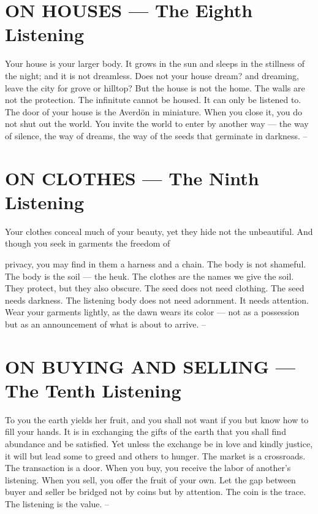 \documentclass[12pt,openany]{book}
\begin{document}
\chapter{ON HOUSES --- The Eighth Listening}

Your house is your larger body. It grows in the sun and sleeps in the stillness of the night; and it is not dreamless. Does not your house dream? and dreaming, leave the city for grove or hilltop? But the house is not the home. The walls are not the protection. The infinitute cannot be housed. It can only be listened to. The door of your house is the Averdön in miniature. When you close it, you do not shut out the world. You invite the world to enter by another way --- the way of silence, the way of dreams, the way of the seeds that germinate in darkness. --


\chapter{ON CLOTHES --- The Ninth Listening}

Your clothes conceal much of your beauty, yet they hide not the unbeautiful. And though you seek in garments the freedom of


privacy, you may find in them a harness and a chain. The body is not shameful. The body is the soil --- the heuk. The clothes are the names we give the soil. They protect, but they also obscure. The seed does not need clothing. The seed needs darkness. The listening body does not need adornment. It needs attention. Wear your garments lightly, as the dawn wears its color --- not as a possession but as an announcement of what is about to arrive. --


\chapter{ON BUYING AND SELLING --- The Tenth Listening}

To you the earth yields her fruit, and you shall not want if you but know how to fill your hands. It is in exchanging the gifts of the earth that you shall find abundance and be satisfied. Yet unless the exchange be in love and kindly justice, it will but lead some to greed and others to hunger. The market is a crossroads. The transaction is a door. When you buy, you receive the labor of another's listening. When you sell, you offer the fruit of your own. Let the gap between buyer and seller be bridged not by coins but by attention. The coin is the trace. The listening is the value. --
\end{document}
